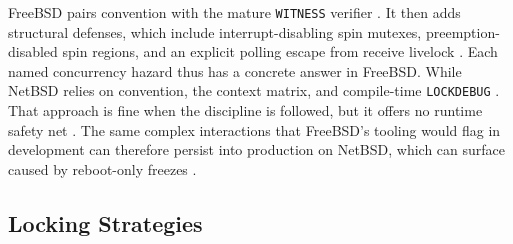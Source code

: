 FreeBSD pairs convention with the mature \texttt{WITNESS} verifier \parencite{freebsd_kerneldebug}. It then
adds structural defenses, which include interrupt-disabling spin mutexes, preemption-disabled spin regions, and an
explicit polling escape from receive livelock \parencite{freebsd_smp_handbook}. Each named concurrency hazard thus has a
concrete answer in FreeBSD. While NetBSD relies on convention, the context matrix, and compile-time \texttt{LOCKDEBUG}
\parencite{netbsd_deadlock_detector}. That approach is fine when the discipline is followed, but it offers no runtime safety net
\parencite{netbsd_deadlock_detector}. The same complex interactions that FreeBSD's tooling would flag in development can
therefore persist into production on NetBSD, which can surface caused by reboot-only freezes \parencite{petermann_jails}.

\subsection{Locking Strategies} \label{locking-strategies} %

